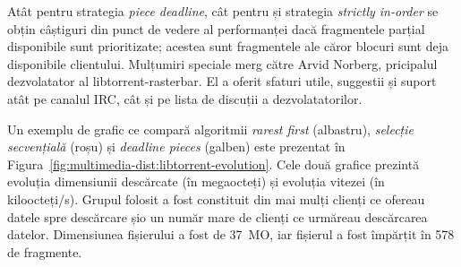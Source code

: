 Atât pentru strategia \textit{piece deadline}, cât pentru și strategia
\textit{strictly in-order} se obțin câștiguri din punct de vedere al
performanței dacă fragmentele parțial disponibile sunt prioritizate; acestea
sunt fragmentele ale căror blocuri sunt deja disponibile clientului. Mulțumiri
speciale merg către Arvid Norberg, pricipalul dezvolatator al
libtorrent-rasterbar. El a oferit sfaturi utile, suggestii și suport atât pe
canalul IRC, cât și pe lista de discuții a dezvolatatorilor.

Un exemplu de grafic ce compară algoritmii \textit{rarest first} (albastru),
\textit{selecție secvențială} (roșu) și \textit{deadline pieces} (galben) este
prezentat în  Figura~\ref{fig:multimedia-dist:libtorrent-evolution}.
Cele două grafice prezintă evoluția dimensiunii descărcate (în megaocteți) și
evoluția vitezei (în kiloocteți/s). Grupul folosit a fost constituit din mai
mulți clienți ce ofereau datele spre descărcare șio un număr mare de clienți
ce urmăreau descărcarea datelor. Dimensiunea fișierului a fost de 37~MO, iar
fișierul a fost împărțit în 578 de fragmente.




